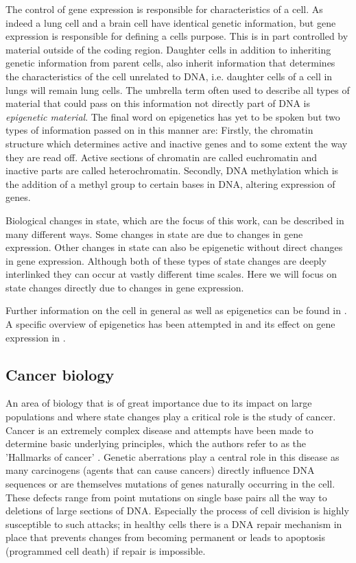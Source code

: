 The control of gene expression is responsible for characteristics of a cell. As indeed a lung cell and a brain cell have  identical genetic information, but gene expression is responsible for defining a cells purpose. This is in part controlled by material outside of the coding region. Daughter cells in addition to inheriting genetic information from parent cells, also inherit information that determines the characteristics of the cell unrelated to DNA, i.e. daughter cells of a cell in lungs will remain lung cells. The umbrella term often used to describe all types of material that could pass on this information not directly part of DNA is \emph{epigenetic material}. The final word on epigenetics has yet to be spoken but two types of information passed on in this manner are: Firstly, the chromatin structure which determines active and inactive genes and to some extent the way they are read off. Active sections of chromatin are called euchromatin and inactive parts are called heterochromatin. Secondly, DNA methylation which is the addition of a methyl group to certain bases in DNA, altering expression of genes.

Biological changes in state, which are the focus of this work, can be described in many different ways. Some changes in state are due to changes in gene expression. Other changes in state can also be epigenetic without direct changes in gene expression. Although both of these types of state changes are deeply interlinked they can occur at vastly different time scales. Here we will focus on state changes directly due to changes in gene expression.

Further information on the cell in general as well as epigenetics can be found in \citet[Chapters~1,7]{Alberts:2007tv}. A specific overview of epigenetics has been attempted in \cite{Goldberg:2007tl} and its effect on gene expression in \cite{Gibney:2010ws}.

\subsection{Cancer biology}
\label{sec:cancer-biology}

An area of biology that is of great importance due to its impact on large populations and where state changes play a critical role is the study of cancer. Cancer is an extremely complex disease and attempts have been made to determine basic underlying principles, which the authors refer to as the 'Hallmarks of cancer' \citep{Hannah:2000wo, Hanahan:2011gu}. Genetic aberrations play a central role in this disease as many carcinogens (agents that can cause cancers) directly influence DNA sequences or are themselves mutations of genes naturally occurring in the cell. These defects range from point mutations on single base pairs all the way to deletions of large sections of DNA. Especially the process of cell division is highly susceptible to such attacks; in healthy cells there is a DNA repair mechanism in place that prevents  changes from becoming permanent or leads to apoptosis (programmed cell death) if repair is impossible.

